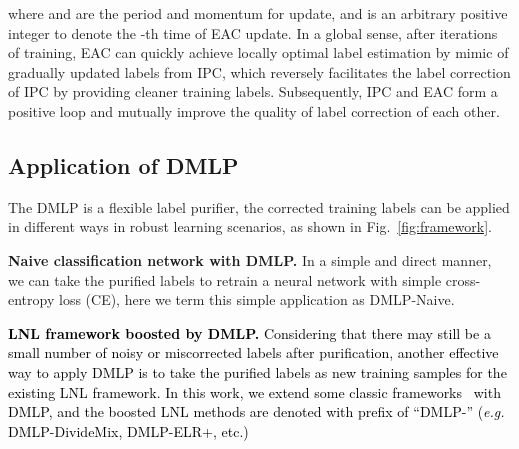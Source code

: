 \documentclass[10pt,twocolumn,letterpaper]{article}
\newcommand{\zbsN}[1]{\textcolor{black}{#1}}
\begin{document}
{where  and  are the period and momentum for update, and  is an arbitrary positive integer to denote the -th time of EAC update. In a global sense, after  iterations of training, EAC can quickly achieve locally optimal label estimation by mimic of gradually updated labels from IPC, which reversely} facilitates the label correction of IPC {by providing} cleaner training labels. Subsequently, IPC and EAC form a positive loop {and mutually improve the quality of label correction of each other}.



\subsection{Application of DMLP}\label{stage3}
{The DMLP is a flexible label purifier, the corrected training labels  can be applied in different ways in robust learning scenarios, as shown in Fig.~\ref{fig:framework}.}

 \textbf{Naive classification network with DMLP.} {In a simple and direct manner, we can take} the purified labels to retrain a neural network with simple cross-entropy loss (CE), here we term this simple application as {DMLP-Naive}.

 \zbsN{\textbf{LNL framework boosted by DMLP.} Considering that there may still be a small number of noisy or miscorrected labels after purification, another effective way to apply DMLP is to take the purified labels as new training samples for the existing LNL framework. In this work, we extend some classic frameworks~\cite{li2020dividemix,2020ELR,2021CDR,Co-han2018co} with DMLP, and the boosted LNL methods are denoted {with prefix of ``DMLP-''} (\emph{e.g.} DMLP-DivideMix, DMLP-ELR+, etc.)}
\end{document}

